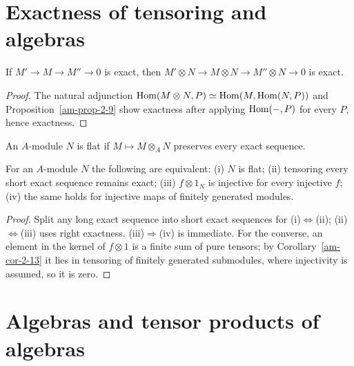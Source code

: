 \section{Exactness of tensoring and algebras}
\label{am-ch2-flat}
\begin{proposition}
\label{am-prop-2-18}
\uses{}
If $M'\to M\to M''\to0$ is exact, then
$M'\otimes N\to M\otimes N\to M''\otimes N\to0$ is exact.
\end{proposition}
\begin{proof}
The natural adjunction
$\operatorname{Hom}(M\otimes N,P)\simeq\operatorname{Hom}(M,\operatorname{Hom}(N,P))$ and Proposition~\ref{am-prop-2-9}
show exactness after applying $\operatorname{Hom}(-,P)$ for every $P$, hence exactness.
\end{proof}
\begin{definition}
\label{am-def-flat}
\uses{}
An $A$-module $N$ is flat if $M\mapsto M\otimes_A N$ preserves every exact
sequence.
\end{definition}
\begin{proposition}
\label{am-prop-2-19}
\uses{}
For an $A$-module $N$ the following are equivalent: (i) $N$ is flat; (ii)
tensoring every short exact sequence remains exact; (iii) $f\otimes1_N$ is
injective for every injective $f$; (iv) the same holds for injective maps of
finitely generated modules.
\end{proposition}
\begin{proof}
Split any long exact sequence into short exact sequences for (i)$\Leftrightarrow$(ii);
(ii)$\Leftrightarrow$(iii) uses right exactness.  (iii)$\Rightarrow$(iv) is
immediate.  For the converse, an element in the kernel of $f\otimes1$ is a
finite sum of pure tensors; by Corollary~\ref{am-cor-2-13} it lies in tensoring
of finitely generated submodules, where injectivity is assumed, so it is zero.
\end{proof}

\section{Algebras and tensor products of algebras}
\label{am-ch2-algebras}

